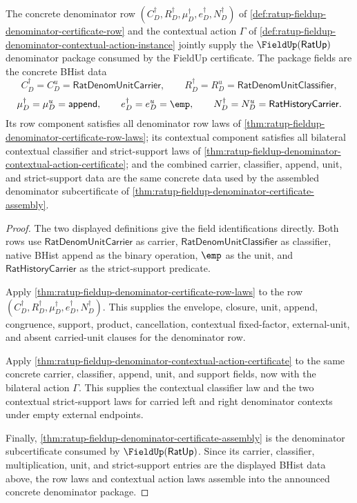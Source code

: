 \begin{theorem}
\label{thm:ratup-fieldup-denominator-complete-contextual-row-package}
The concrete denominator row
$(C_D^\dagger,R_D^\dagger,\mu_D^\dagger,e_D^\dagger,N_D^\dagger)$ of
\autoref{def:ratup-fieldup-denominator-certificate-row} and the contextual
action $\Gamma$ of
\autoref{def:ratup-fieldup-denominator-contextual-action-instance} jointly
supply the $\FieldUp(\mathsf{RatUp})$ denominator package consumed by the
FieldUp certificate. The package fields are the concrete BHist data
$$
C_D^\dagger=C_D^u=\mathsf{RatDenomUnitCarrier},\qquad
R_D^\dagger=R_D^u=\mathsf{RatDenomUnitClassifier},
$$
$$
\mu_D^\dagger=\mu_D^u=\mathsf{append},\qquad
e_D^\dagger=e_D^u=\emp,\qquad
N_D^\dagger=N_D^u=\mathsf{RatHistoryCarrier}.
$$
Its row component satisfies all denominator row laws of
\autoref{thm:ratup-fieldup-denominator-certificate-row-laws}; its contextual
component satisfies all bilateral contextual classifier and strict-support laws
of
\autoref{thm:ratup-fieldup-denominator-contextual-action-certificate}; and the
combined carrier, classifier, append, unit, and strict-support data are the same
concrete data used by the assembled denominator subcertificate of
\autoref{thm:ratup-fieldup-denominator-certificate-assembly}.
\end{theorem}
\begin{proof}
The two displayed definitions give the field identifications directly. Both
rows use $\mathsf{RatDenomUnitCarrier}$ as carrier,
$\mathsf{RatDenomUnitClassifier}$ as classifier, native BHist append as the
binary operation, $\emp$ as the unit, and $\mathsf{RatHistoryCarrier}$ as the
strict-support predicate.

Apply
\autoref{thm:ratup-fieldup-denominator-certificate-row-laws} to the row
$(C_D^\dagger,R_D^\dagger,\mu_D^\dagger,e_D^\dagger,N_D^\dagger)$. This
supplies the envelope, closure, unit, append, congruence, support, product,
cancellation, contextual fixed-factor, external-unit, and absent carried-unit
clauses for the denominator row.

Apply
\autoref{thm:ratup-fieldup-denominator-contextual-action-certificate} to the
same concrete carrier, classifier, append, unit, and support fields, now with
the bilateral action $\Gamma$. This supplies the contextual classifier law and
the two contextual strict-support laws for carried left and right denominator
contexts under empty external endpoints.

Finally,
\autoref{thm:ratup-fieldup-denominator-certificate-assembly} is the denominator
subcertificate consumed by $\FieldUp(\mathsf{RatUp})$. Since its carrier,
classifier, multiplication, unit, and strict-support entries are the displayed
BHist data above, the row laws and contextual action laws assemble into the
announced concrete denominator package.
\end{proof}

